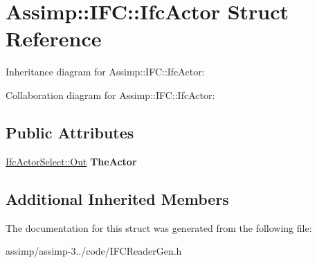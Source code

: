 \hypertarget{struct_assimp_1_1_i_f_c_1_1_ifc_actor}{\section{Assimp\+:\+:I\+F\+C\+:\+:Ifc\+Actor Struct Reference}
\label{struct_assimp_1_1_i_f_c_1_1_ifc_actor}
}


Inheritance diagram for Assimp\+:\+:I\+F\+C\+:\+:Ifc\+Actor\+:


Collaboration diagram for Assimp\+:\+:I\+F\+C\+:\+:Ifc\+Actor\+:
\subsection*{Public Attributes}
\begin{DoxyCompactItemize}
\item 
\hypertarget{struct_assimp_1_1_i_f_c_1_1_ifc_actor_a0c2c6e2109a496ff687ef682e33bcf8f}{\hyperlink{classboost_1_1shared__ptr}{Ifc\+Actor\+Select\+::\+Out} {\bfseries The\+Actor}}\label{struct_assimp_1_1_i_f_c_1_1_ifc_actor_a0c2c6e2109a496ff687ef682e33bcf8f}

\end{DoxyCompactItemize}
\subsection*{Additional Inherited Members}


The documentation for this struct was generated from the following file\+:\begin{DoxyCompactItemize}
\item 
assimp/assimp-\/3../code/I\+F\+C\+Reader\+Gen.\+h\end{DoxyCompactItemize}
